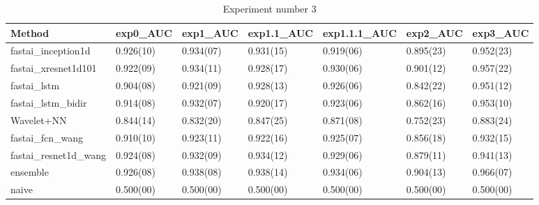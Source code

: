 \begin{table}[hp]
\scriptsize
\caption{Experiment number 3}
\begin{tabular}{lllllll}
\cellcolor[HTML]{C0C0C0}\textbf{Method} & \cellcolor[HTML]{C0C0C0}\textbf{exp0\_AUC} & \cellcolor[HTML]{C0C0C0}\textbf{exp1\_AUC} & \cellcolor[HTML]{C0C0C0}\textbf{exp1.1\_AUC} & \cellcolor[HTML]{C0C0C0}\textbf{exp1.1.1\_AUC} & \cellcolor[HTML]{C0C0C0}\textbf{exp2\_AUC} & \cellcolor[HTML]{C0C0C0}\textbf{exp3\_AUC} \\\hline
fastai\_inception1d         & 0.926(10)	& 0.934(07)	& 0.931(15)	& 0.919(06)	& 0.895(23)	& 0.952(23) \\
fastai\_xresnet1d101        & 0.922(09) & 0.934(11) & 0.928(17) & 0.930(06) & 0.901(12) & 0.957(22) \\
fastai\_lstm                & 0.904(08)	& 0.921(09)	& 0.928(13)	& 0.926(06)	& 0.842(22)	& 0.951(12) \\
fastai\_lstm\_bidir         & 0.914(08) & 0.932(07) & 0.920(17) & 0.923(06) & 0.862(16) & 0.953(10) \\
Wavelet+NN                  & 0.844(14)	& 0.832(20)	& 0.847(25)	& 0.871(08)	& 0.752(23)	& 0.883(24) \\
fastai\_fcn\_wang           & 0.910(10) & 0.923(11) & 0.922(16) & 0.925(07) & 0.856(18) & 0.932(15) \\
fastai\_resnet1d\_wang      & 0.924(08)	& 0.932(09)	& 0.934(12)	& 0.929(06)	& 0.879(11)	& 0.941(13) \\
ensemble                    & 0.926(08)	& 0.938(08)	& 0.938(14)	& 0.934(06)	& 0.904(13)	& 0.966(07) \\
naive                       & 0.500(00) & 0.500(00) & 0.500(00) & 0.500(00) & 0.500(00) & 0.500(00) \\\hline                              
\end{tabular}
\end{table}
